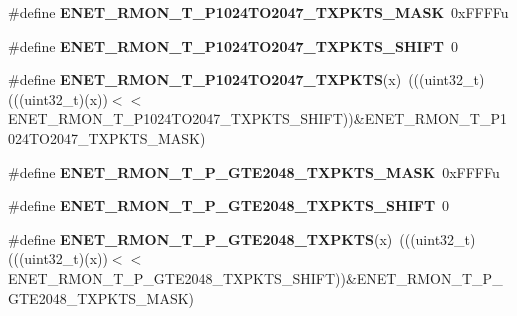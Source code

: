 \begin{DoxyCompactItemize}
\item 
\#define {\bfseries E\+N\+E\+T\+\_\+\+R\+M\+O\+N\+\_\+\+T\+\_\+\+P1024\+T\+O2047\+\_\+\+T\+X\+P\+K\+T\+S\+\_\+\+M\+A\+SK}~0x\+F\+F\+F\+Fu\hypertarget{group__ENET__Register__Masks_ga874fdbd030f1c4a977a7f989cb316a6c}{}\label{group__ENET__Register__Masks_ga874fdbd030f1c4a977a7f989cb316a6c}

\item 
\#define {\bfseries E\+N\+E\+T\+\_\+\+R\+M\+O\+N\+\_\+\+T\+\_\+\+P1024\+T\+O2047\+\_\+\+T\+X\+P\+K\+T\+S\+\_\+\+S\+H\+I\+FT}~0\hypertarget{group__ENET__Register__Masks_gaec4f9a8714bcb59e866d0e64b70f0fde}{}\label{group__ENET__Register__Masks_gaec4f9a8714bcb59e866d0e64b70f0fde}

\item 
\#define {\bfseries E\+N\+E\+T\+\_\+\+R\+M\+O\+N\+\_\+\+T\+\_\+\+P1024\+T\+O2047\+\_\+\+T\+X\+P\+K\+TS}(x)~(((uint32\+\_\+t)(((uint32\+\_\+t)(x))$<$$<$E\+N\+E\+T\+\_\+\+R\+M\+O\+N\+\_\+\+T\+\_\+\+P1024\+T\+O2047\+\_\+\+T\+X\+P\+K\+T\+S\+\_\+\+S\+H\+I\+FT))\&E\+N\+E\+T\+\_\+\+R\+M\+O\+N\+\_\+\+T\+\_\+\+P1024\+T\+O2047\+\_\+\+T\+X\+P\+K\+T\+S\+\_\+\+M\+A\+SK)\hypertarget{group__ENET__Register__Masks_ga7d34dedcf25d5b7973dc87c620f61e75}{}\label{group__ENET__Register__Masks_ga7d34dedcf25d5b7973dc87c620f61e75}

\item 
\#define {\bfseries E\+N\+E\+T\+\_\+\+R\+M\+O\+N\+\_\+\+T\+\_\+\+P\+\_\+\+G\+T\+E2048\+\_\+\+T\+X\+P\+K\+T\+S\+\_\+\+M\+A\+SK}~0x\+F\+F\+F\+Fu\hypertarget{group__ENET__Register__Masks_ga6727e73f1f19091ffc8c3677c27cf51c}{}\label{group__ENET__Register__Masks_ga6727e73f1f19091ffc8c3677c27cf51c}

\item 
\#define {\bfseries E\+N\+E\+T\+\_\+\+R\+M\+O\+N\+\_\+\+T\+\_\+\+P\+\_\+\+G\+T\+E2048\+\_\+\+T\+X\+P\+K\+T\+S\+\_\+\+S\+H\+I\+FT}~0\hypertarget{group__ENET__Register__Masks_ga8ebafd824d8947f833675eeed78a3fb1}{}\label{group__ENET__Register__Masks_ga8ebafd824d8947f833675eeed78a3fb1}

\item 
\#define {\bfseries E\+N\+E\+T\+\_\+\+R\+M\+O\+N\+\_\+\+T\+\_\+\+P\+\_\+\+G\+T\+E2048\+\_\+\+T\+X\+P\+K\+TS}(x)~(((uint32\+\_\+t)(((uint32\+\_\+t)(x))$<$$<$E\+N\+E\+T\+\_\+\+R\+M\+O\+N\+\_\+\+T\+\_\+\+P\+\_\+\+G\+T\+E2048\+\_\+\+T\+X\+P\+K\+T\+S\+\_\+\+S\+H\+I\+FT))\&E\+N\+E\+T\+\_\+\+R\+M\+O\+N\+\_\+\+T\+\_\+\+P\+\_\+\+G\+T\+E2048\+\_\+\+T\+X\+P\+K\+T\+S\+\_\+\+M\+A\+SK)\hypertarget{group__ENET__Register__Masks_gaa17d4f1013a6f284d558190f7aab76ac}{}\label{group__ENET__Register__Masks_gaa17d4f1013a6f284d558190f7aab76ac}


\end{DoxyCompactItemize}

